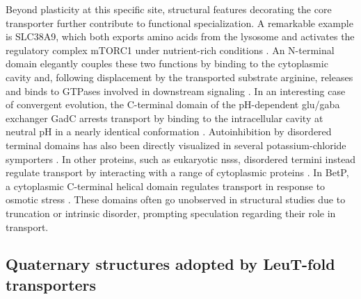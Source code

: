Beyond plasticity at this specific site, structural features decorating the core transporter further contribute to functional specialization. A remarkable example is SLC38A9, which both exports amino acids from the lysosome and activates the regulatory complex mTORC1 under nutrient-rich conditions \citep*{Rebsamen2015, Wang2015}. An N-terminal domain elegantly couples these two functions by binding to the cytoplasmic cavity \citep*{Lei2021} and, following displacement by the transported substrate arginine, releases and binds to GTPases involved in downstream signaling \citep*{Fromm2020}. In an interesting case of convergent evolution, the C-terminal domain of the pH-dependent \gls{glu}/\gls{gaba} exchanger GadC arrests transport by binding to the intracellular cavity at neutral pH in a nearly identical conformation \citep*{Ma2012}. Autoinhibition by disordered terminal domains has also been directly visualized in several potassium-chloride symporters \citep*{Chi2021, Xie2020}. In other proteins, such as eukaryotic \gls{nss}s, disordered termini instead regulate transport by interacting with a range of cytoplasmic proteins \citep*{Cooper2019, Karam2018}. In BetP, a cytoplasmic C-terminal helical domain regulates transport in response to osmotic stress \citep*{Gueler2016, Kraemer2009}. These domains often go unobserved in structural studies \citep*{Coleman2016, Liu2019, Penmatsa2013} due to truncation or intrinsic disorder, prompting speculation regarding their role in transport.

\newpage

\subsection{Quaternary structures adopted by LeuT-fold transporters}


